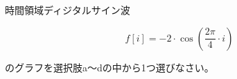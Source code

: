 時間領域ディジタルサイン波 

\[
f[i] = -2 \cdot \cos \left ( \frac{2 \pi}{4} \cdot i  \right )
\]

\noindent のグラフを選択肢a〜dの中から1つ選びなさい。
